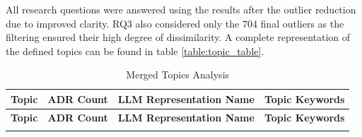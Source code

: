         All research questions were answered using the results after the outlier reduction due to improved clarity. RQ3 also considered only the 704 final outliers as the filtering ensured their high degree of dissimilarity. A complete representation of the defined topics can be found in table \ref{table:topic_table}.
        
        \begin{longtable}{|p{1cm}|p{1.12cm}|p{3.3cm}|p{9cm}|}
            \caption{Merged Topics Analysis} \\
            \hline
            \textbf{Topic} & \textbf{ADR Count} & \textbf{LLM Representation Name} & \textbf{Topic Keywords} \\
            \hline
            \endfirsthead
            
            \hline
            \textbf{Topic} & \textbf{ADR Count} & \textbf{LLM Representation Name} & \textbf{Topic Keywords} \\
            \hline
            \endhead
            
            \hline
            \endfoot
            
            \hline
            \endlastfoot
            

\end{longtable}
